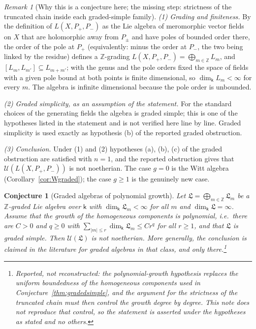 \documentclass[11pt]{ctexart}
\theoremstyle{plain}
\newtheorem{conjecture}[theorem]{Conjecture}
\theoremstyle{definition}
\theoremstyle{remark}
\newtheorem{remark}[theorem]{Remark}
\newcommand{\kk}{\mathsf{k}}
\newcommand{\LL}{\mathfrak{L}}
\newcommand{\UU}{\mathcal{U}}
\begin{document}
\begin{remark}[Why this is a conjecture here; the missing step: strictness of the truncated chain inside each graded-simple family]\label{rem:kn-missing}
\emph{(1) Grading and finiteness.} By the definition of
$L(X,P_+,P_-)$ as the Lie algebra of meromorphic vector fields on $X$ that are
holomorphic away from $P_\pm$ and have poles of bounded order there, the order of the
pole at $P_+$ (equivalently: minus the order at $P_-$, the two being linked by the
residue) defines a $\mathbb{Z}$-grading $L(X,P_+,P_-)=\bigoplus_{m\in\mathbb{Z}}L_m$,
and $[L_m,L_{m'}]\subseteq L_{m+m'}$; with the genus and the pole orders fixed the space
of fields with a given pole bound at both points is finite dimensional, so
$\dim_\kk L_m<\infty$ for every $m$. The algebra is infinite dimensional because the
pole order is unbounded.

\emph{(2) Graded simplicity, as an assumption of the statement.} For the standard
choices of the generating fields the algebra is graded simple; this is one of the
hypotheses listed in the statement and is not verified here line by line. Graded
simplicity is used exactly as hypothesis (b) of the reported graded obstruction.

\emph{(3) Conclusion.} Under (1) and (2) hypotheses (a), (b), (c) of the graded
obstruction are satisfied with $n=1$, and the reported obstruction gives that
$\UU(L(X,P_+,P_-))$ is not noetherian. The case $g=0$ is the Witt algebra
(Corollary~\ref{cor:Wgraded}); the case $g\ge1$ is the genuinely new case.
\end{remark}

\begin{conjecture}[Graded algebras of polynomial growth]\label{thm:poly}
Let $\LL=\bigoplus_{m\in\mathbb{Z}}\LL_m$ be a $\mathbb{Z}$-graded Lie algebra over
$\kk$ with $\dim_\kk\LL_m<\infty$ for all $m$ and $\dim_\kk\LL=\infty$. Assume that the
growth of the homogeneous components is polynomial, i.e.\ there are $C>0$ and $q\ge0$
with $\sum_{|m|\le r}\dim_\kk\LL_m\le Cr^{q}$ for all $r\ge1$, and that $\LL$ is
graded simple. Then $\UU(\LL)$ is not noetherian. More generally, the conclusion is
claimed in the literature for graded algebras in that class, and only there.\footnote{Reported, not reconstructed: the polynomial-growth hypothesis replaces the
uniform boundedness of the homogeneous components used in
Conjecture~\ref{thm:gradedsimple}, and the argument for the strictness of the truncated
chain must then control the growth degree by degree. This note does not reproduce that
control, so the statement is asserted under the hypotheses as stated and no others.}
\end{conjecture}
\end{document}
